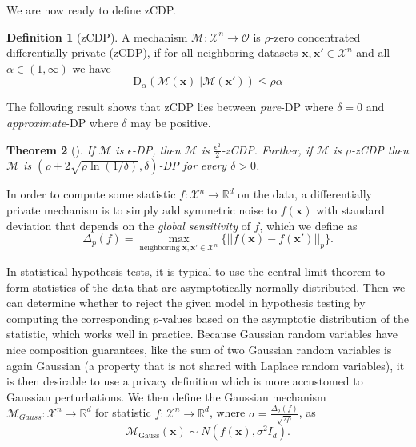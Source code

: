 \documentclass[twoside,letterpaper]{article} \usepackage{aistats2017}
\newtheorem{theorem}{Theorem}[section]
\theoremstyle{definition}
\newtheorem{definition}[theorem]{Definition}
\theoremstyle{remark}
\begin{document}
We are now ready to define zCDP.
\begin{definition}[zCDP]
A mechanism ${\mathcal{M}}: {\mathcal{X}}^n \to {\mathcal{O}}$ is $\rho$-zero concentrated differentially private (zCDP), if for all neighboring datasets ${\mathbf{x}},{\mathbf{x}}' \in {\mathcal{X}}^n$  and all $\alpha \in (1,\infty)$ we have 
$$
{\text{D}_{{\alpha}}\left({{\mathcal{M}}({\mathbf{x}})}||{{\mathcal{M}}({\mathbf{x}}')} \right)} \leq \rho \alpha
$$
\end{definition}The following result shows that zCDP lies between \emph{pure}-DP where $\delta =0$ and \emph{approximate}-DP where $\delta$ may be positive.
\begin{theorem}[\citep{BS16}]\label{thm:zcdpcompare}
If ${\mathcal{M}}$ is $\epsilon$-DP, then ${\mathcal{M}}$ is $\frac{\epsilon^2}{2}$-zCDP.  Further, if ${\mathcal{M}}$ is $\rho$-zCDP then ${\mathcal{M}}$ is $(\rho + 2\sqrt{\rho\ln(1/\delta)},\delta)$-DP for every $\delta>0$.  
\label{thm:reduction}
\end{theorem}

In order to compute some statistic $f: {\mathcal{X}}^n \to {\mathbb{R}}^d$ on the data, a differentially private mechanism is to simply add symmetric noise to $f({\mathbf{x}})$ with standard deviation that depends on the \emph{global sensitivity} of $f$, which we define as 
$$
\Delta_p(f) = \max_{\text{neighboring } {\mathbf{x}}, {\mathbf{x}}' \in {\mathcal{X}}^n }\{ ||f({\mathbf{x}}) - f({\mathbf{x}}') ||_p\}.
$$

In statistical hypothesis tests, it is typical to use the central limit theorem to form statistics of the data that are asymptotically normally distributed.  Then we can determine whether to reject the given model in hypothesis testing by computing the corresponding $p$-values based on the asymptotic distribution of the statistic, which works well in practice.  Because Gaussian random variables have nice composition guarantees, like the sum of two Gaussian random variables is again Gaussian (a property that is not shared with Laplace random variables), it is then desirable to use a privacy definition which is more accustomed to Gaussian perturbations.  We then define the Gaussian mechanism ${\mathcal{M}}_{Gauss}: {\mathcal{X}}^n  \to {\mathbb{R}}^d$ for statistic $f: {\mathcal{X}}^n \to {\mathbb{R}}^d$, where $\sigma = \frac{\Delta_2(f) }{\sqrt{2\rho}}$, as
\begin{equation}
{{\mathcal{M}}_{\text{Gauss}}}({\mathbf{x}}) \sim N(f({\mathbf{x}}),\sigma^2I_d).
\label{eq:GM}
\end{equation}
\end{document}
